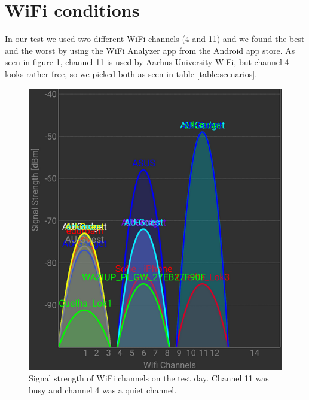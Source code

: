 \section{WiFi conditions}\label{sc:wifi}
In our test we used two different WiFi channels (4 and 11) and we found the best and the worst by using the WiFi Analyzer app from the Android app store\cite{Farproc@gmail.com2018}. As seen in figure \ref{fig:wifionthetestday}, channel 11 is used by Aarhus University WiFi, but channel 4 looks rather free, so we picked both as seen in table \ref{table:scenarios}.

\begin{figure}[h]
	\centering
	\includegraphics[width=1\linewidth]{testAndPerformance/wifi/wifiOnTheTestDay}
	\caption{Signal strength of WiFi channels on the test day. Channel 11 was busy and channel 4 was a quiet channel.}
	\label{fig:wifionthetestday}
\end{figure}
